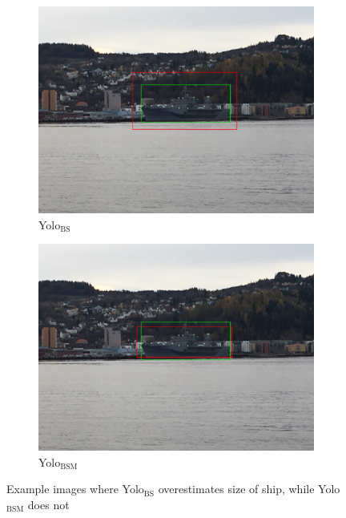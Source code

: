\begin{figure}[h!]
\begin{subfigure}{.5\textwidth}
  \centering
  \includegraphics[width=0.75\linewidth]{results/case_tr_moor/yolo12/yolo1/big/IMG_2670.jpg}
  \caption{Yolo$_{\text{BS}}$}
\end{subfigure}%
\begin{subfigure}{.5\textwidth}
  \centering
  \includegraphics[width=.75\linewidth]{results/case_tr_moor/yolo12/yolo2/big/IMG_2670.jpg}
  \caption{Yolo$_{\text{BSM}}$}
\end{subfigure}
\caption{Example images where Yolo$_{\text{BS}}$ overestimates size of ship, while Yolo$_{\text{BSM}}$ does not}
\label{img:yolo1_big_box}
\end{figure}

\newpage
